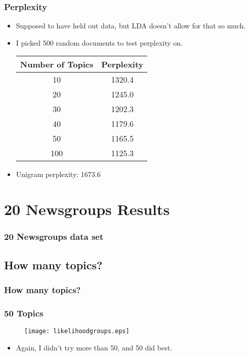\documentclass{beamer}
\begin{document}
\begin{frame}
  \frametitle{Perplexity}
  \begin{itemize}
	\item Supposed to have held out data, but LDA doesn't allow for that so
	  much.
	\item I picked 500 random documents to test perplexity on.
	  \begin{tabular}{|c|c|}
		\hline
		Number of Topics&Perplexity \\
		\hline
		10&1320.4 \\
		\hline
		20&1245.0 \\
		\hline
		30&1202.3 \\
		\hline
		40&1179.6 \\
		\hline
		50&1165.5 \\
		\hline
		100&1125.3 \\
		\hline
	  \end{tabular}
	\item Unigram perplexity: 1673.6
  \end{itemize}
\end{frame}






\section{20 Newsgroups Results}

\begin{frame}
  \frametitle{20 Newsgroups data set}
\end{frame}

\subsection{How many topics?}

\begin{frame}
  \frametitle{How many topics?}
\end{frame}

\begin{frame}
  \frametitle{50 Topics}
  \begin{figure}
	\texttt{[image: likelihoodgroups.eps]}
  \end{figure}
  \begin{itemize}
	\item Again, I didn't try more than 50, and 50 did best.
  \end{itemize}
\end{frame}
\end{document}
